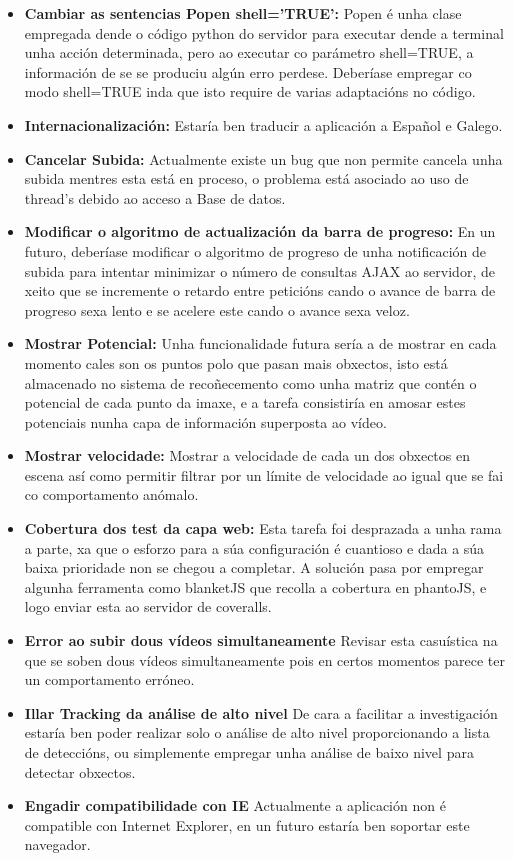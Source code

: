     \begin{itemize}
     \item \textbf{Cambiar as sentencias Popen shell='TRUE':}     
        Popen é unha clase empregada dende o código python do servidor para executar dende a 
        terminal unha acción determinada, pero ao executar co parámetro shell=TRUE, a información
        de se se produciu algún erro perdese. Deberíase empregar co modo shell=TRUE inda que isto
        require de varias adaptacións no código.
     \item \textbf{Internacionalización:}
        Estaría ben traducir a aplicación a Español e Galego.
     \item \textbf{Cancelar Subida:}
        Actualmente existe un bug que non permite cancela unha subida mentres esta está en proceso,
        o problema está asociado ao uso de thread's debido ao acceso a Base de datos.
     \item \textbf{Modificar o algoritmo de actualización da barra de progreso:}
        En un futuro, deberíase modificar o algoritmo de progreso de unha notificación de subida para intentar
        minimizar o número de consultas AJAX ao servidor, de xeito que se incremente o retardo entre peticións
        cando o avance de barra de progreso sexa lento e se acelere este cando o avance sexa veloz.
    \item \textbf{Mostrar Potencial:}
        Unha funcionalidade futura sería a de mostrar en cada momento cales son os puntos polo que 
        pasan mais obxectos, isto está almacenado no sistema de recoñecemento como unha matriz que 
        contén o potencial de cada punto da imaxe, e a tarefa consistiría en amosar estes potenciais
        nunha capa de información superposta ao vídeo.
    \item \textbf{Mostrar velocidade:}
        Mostrar a velocidade de cada un dos obxectos en escena así como permitir filtrar por un 
        límite de velocidade ao igual que se fai co comportamento anómalo.
    \item \textbf{Cobertura dos test da capa web:}
        Esta tarefa foi desprazada a unha rama a parte, xa que o esforzo para a súa configuración é
        cuantioso e dada a súa baixa prioridade non se chegou a completar. A solución pasa por 
        empregar algunha ferramenta como blanketJS que recolla a cobertura en phantoJS, e logo 
        enviar esta ao servidor de coveralls. 
    \item \textbf{Error ao subir dous vídeos simultaneamente}
        Revisar esta casuística na que se soben dous vídeos simultaneamente pois en certos momentos
        parece ter un comportamento erróneo.
    \item \textbf{Illar Tracking da análise de alto nivel}
        De cara a facilitar a investigación estaría ben poder realizar solo o análise de alto nivel 
        proporcionando a lista de deteccións, ou simplemente empregar unha análise de baixo nivel 
        para detectar obxectos.
    \item \textbf{Engadir compatibilidade con IE}
        Actualmente a aplicación non é compatible con Internet Explorer, en un futuro estaría ben 
        soportar este navegador.
    \end{itemize}

